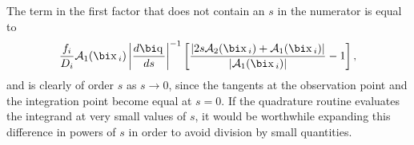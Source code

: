 The term in the first factor
that does not contain an $s$ in the numerator is equal to
$${f_i\over D_i}{\cal A}_1(\bd{x}_i)\left|{d\bd{q}\over ds}\right|^{-1}
\left[{|2s{\cal A}_2(\bd{x}_i)+{\cal A}_1(\bd{x}_i)|\over
|{\cal A}_1(\bd{x}_i)|}-1\right],$$
and is clearly of order $s$ as $s\to0$, since the tangents at the observation
point and the integration point become equal at $s=0$. If the quadrature
routine evaluates the integrand at very small values of $s$, it would be
worthwhile expanding this difference in powers of $s$ in order to
avoid division by small quantities.

